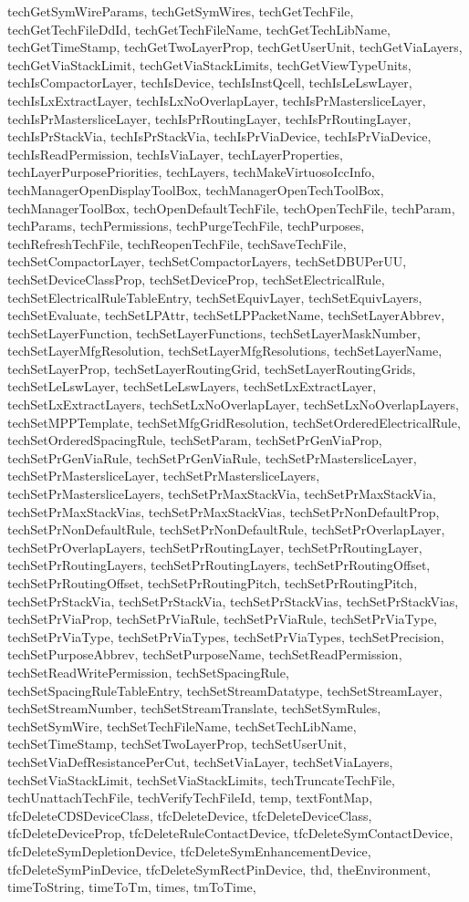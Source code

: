{{techGetSymWireParams, techGetSymWires, techGetTechFile, techGetTechFileDdId, techGetTechFileName, techGetTechLibName, techGetTimeStamp, techGetTwoLayerProp, techGetUserUnit, techGetViaLayers, techGetViaStackLimit, techGetViaStackLimits, techGetViewTypeUnits, techIsCompactorLayer, techIsDevice, techIsInstQcell, techIsLeLswLayer, techIsLxExtractLayer, techIsLxNoOverlapLayer, techIsPrMastersliceLayer, techIsPrMastersliceLayer, techIsPrRoutingLayer, techIsPrRoutingLayer, techIsPrStackVia, techIsPrStackVia, techIsPrViaDevice, techIsPrViaDevice, techIsReadPermission, techIsViaLayer, techLayerProperties, techLayerPurposePriorities, techLayers, techMakeVirtuosoIccInfo, techManagerOpenDisplayToolBox, techManagerOpenTechToolBox, techManagerToolBox, techOpenDefaultTechFile, techOpenTechFile, techParam, techParams, techPermissions, techPurgeTechFile, techPurposes, techRefreshTechFile, techReopenTechFile, techSaveTechFile, techSetCompactorLayer, techSetCompactorLayers, techSetDBUPerUU, techSetDeviceClassProp, techSetDeviceProp, techSetElectricalRule, techSetElectricalRuleTableEntry, techSetEquivLayer, techSetEquivLayers, techSetEvaluate, techSetLPAttr, techSetLPPacketName, techSetLayerAbbrev, techSetLayerFunction, techSetLayerFunctions, techSetLayerMaskNumber, techSetLayerMfgResolution, techSetLayerMfgResolutions, techSetLayerName, techSetLayerProp, techSetLayerRoutingGrid, techSetLayerRoutingGrids, techSetLeLswLayer, techSetLeLswLayers, techSetLxExtractLayer, techSetLxExtractLayers, techSetLxNoOverlapLayer, techSetLxNoOverlapLayers, techSetMPPTemplate, techSetMfgGridResolution, techSetOrderedElectricalRule, techSetOrderedSpacingRule, techSetParam, techSetPrGenViaProp, techSetPrGenViaRule, techSetPrGenViaRule, techSetPrMastersliceLayer, techSetPrMastersliceLayer, techSetPrMastersliceLayers, techSetPrMastersliceLayers, techSetPrMaxStackVia, techSetPrMaxStackVia, techSetPrMaxStackVias, techSetPrMaxStackVias, techSetPrNonDefaultProp, techSetPrNonDefaultRule, techSetPrNonDefaultRule, techSetPrOverlapLayer, techSetPrOverlapLayers, techSetPrRoutingLayer, techSetPrRoutingLayer, techSetPrRoutingLayers, techSetPrRoutingLayers, techSetPrRoutingOffset, techSetPrRoutingOffset, techSetPrRoutingPitch, techSetPrRoutingPitch, techSetPrStackVia, techSetPrStackVia, techSetPrStackVias, techSetPrStackVias, techSetPrViaProp, techSetPrViaRule, techSetPrViaRule, techSetPrViaType, techSetPrViaType, techSetPrViaTypes, techSetPrViaTypes, techSetPrecision, techSetPurposeAbbrev, techSetPurposeName, techSetReadPermission, techSetReadWritePermission, techSetSpacingRule, techSetSpacingRuleTableEntry, techSetStreamDatatype, techSetStreamLayer, techSetStreamNumber, techSetStreamTranslate, techSetSymRules, techSetSymWire, techSetTechFileName, techSetTechLibName, techSetTimeStamp, techSetTwoLayerProp, techSetUserUnit, techSetViaDefResistancePerCut, techSetViaLayer, techSetViaLayers, techSetViaStackLimit, techSetViaStackLimits, techTruncateTechFile, techUnattachTechFile, techVerifyTechFileId, temp, textFontMap, tfcDeleteCDSDeviceClass, tfcDeleteDevice, tfcDeleteDeviceClass, tfcDeleteDeviceProp, tfcDeleteRuleContactDevice, tfcDeleteSymContactDevice, tfcDeleteSymDepletionDevice, tfcDeleteSymEnhancementDevice, tfcDeleteSymPinDevice, tfcDeleteSymRectPinDevice, thd, theEnvironment, timeToString, timeToTm, times, tmToTime, }}
